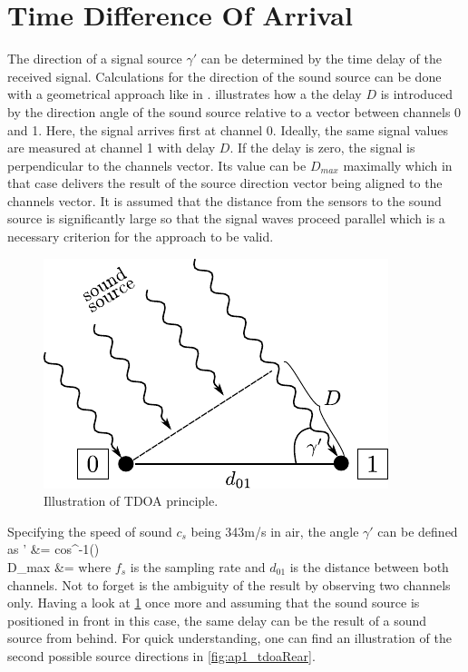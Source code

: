 \section{Time Difference Of Arrival}
\label{sec:02_tdoa}

The direction of a signal source $\gamma'$ can be determined by the time
delay of the received signal.
Calculations for the direction of the sound source can be done with a
geometrical approach like in \cite{Valin_Michaud}.
 illustrates how a the delay $D$ is introduced by the direction angle
of the sound source relative to a vector between channels 0 and 1.
Here, the signal arrives first at channel 0. Ideally, the same signal values
are measured at channel 1 with delay $D$.
If the delay is zero, the signal is perpendicular to the channels vector.
Its value can be $D_{max}$ maximally which in that case delivers the
result of the source direction vector being aligned to the channels vector.
It is assumed that the distance from the sensors to the sound source is
significantly large so that the signal waves proceed parallel which is a necessary
criterion for the approach to be valid.
\begin{figure}[ht]
	\centering
		\includegraphics[width=0.4\columnwidth]{figures/tdoa_waves}
	\caption{Illustration of TDOA principle.}
    \label{fig:02_tdoa}
\end{figure}

Specifying the speed of sound $c_s$ being 343\si{m/s} in air, the angle
$\gamma'$ can be defined as
\bsub \bal
    \gamma' &= cos^{-1}()
    \label{eq:02_tdoaAngle}\\
    D_{max} &= 
\eal \esub
where $f_s$ is the sampling rate and $d_{01}$ is the distance between both channels.
Not to forget is the ambiguity of the result by observing two channels only.
Having a look at \cref{fig:02_tdoa} once more and assuming that the sound source
is positioned in front in this case, the same delay can be the result of a
sound source from behind.
For quick understanding, one can find an illustration of the second possible
source directions in \cref{fig:ap1_tdoaRear}.


